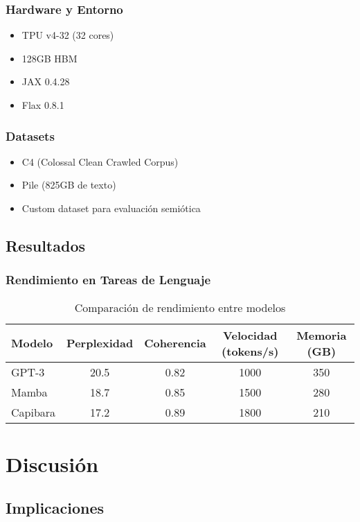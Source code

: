 \documentclass[12pt,a4paper]{article}
\begin{document}
\subsubsection{Hardware y Entorno}
\begin{itemize}
    \item TPU v4-32 (32 cores)
    \item 128GB HBM
    \item JAX 0.4.28
    \item Flax 0.8.1
\end{itemize}

\subsubsection{Datasets}
\begin{itemize}
    \item C4 (Colossal Clean Crawled Corpus)
    \item Pile (825GB de texto)
    \item Custom dataset para evaluación semiótica
\end{itemize}

\subsection{Resultados}

\subsubsection{Rendimiento en Tareas de Lenguaje}

\begin{table}[h]
\centering
\begin{tabular}{|l|c|c|c|c|}
\hline
Modelo & Perplexidad & Coherencia & Velocidad (tokens/s) & Memoria (GB) \\
\hline
GPT-3  & 20.5 & 0.82 & 1000 & 350 \\
Mamba  & 18.7 & 0.85 & 1500 & 280 \\
Capibara & 17.2 & 0.89 & 1800 & 210 \\
\hline
\end{tabular}
\caption{Comparación de rendimiento entre modelos}
\end{table}

\section{Discusión}

\subsection{Implicaciones}
\end{document}
